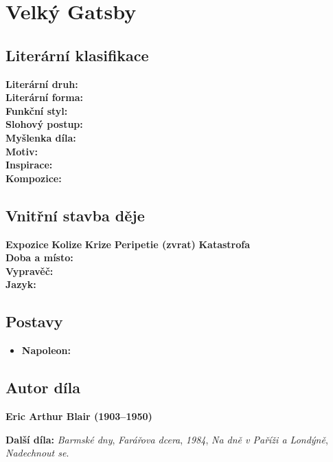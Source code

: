\documentclass[12pt, a4paper]{article}
\newcommand{\mybf}[1]{\textcolor[RGB]{0, 179, 219}{\textbf{#1}}}
\begin{document}
\newpage

\section{Velký Gatsby}

\subsection*{Literární klasifikace}
\mybf{Literární druh:} \\[3pt]
\mybf{Literární forma:} \\[3pt]
\mybf{Funkční styl:} \\[3pt]
\mybf{Slohový postup:} \\[10pt]
\mybf{Myšlenka díla:} \\[10pt]
\mybf{Motiv:} \\[10pt]
\mybf{Inspirace:} \\[10pt]
\mybf{Kompozice:} 

\subsection*{Vnitřní stavba děje}
\noindent\textbf{Expozice} 
\noindent\textbf{Kolize} 
\noindent\textbf{Krize} 
\noindent\textbf{Peripetie (zvrat)} 
\noindent\textbf{Katastrofa} \\[10pt]
\mybf{Doba a místo:} \\[10pt]
\mybf{Vypravěč:} \\[10pt]
\mybf{Jazyk:} 

\subsection*{Postavy}
\begin{itemize}[itemsep=0.3em]
	\item \textbf{Napoleon:}
\end{itemize}

\subsection*{Autor díla}
\textbf{Eric Arthur Blair (1903--1950)}

\textbf{Další díla:} \textit{Barmské dny}, \textit{Farářova dcera}, \textit{1984}, \textit{Na dně v Paříži a Londýně}, \textit{Nadechnout se}.
\end{document}
